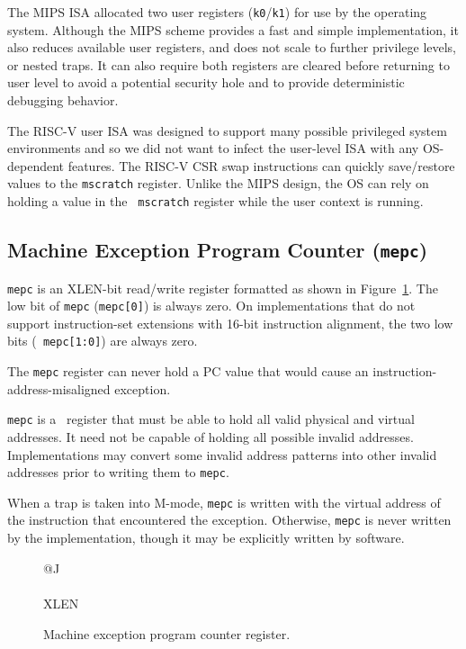 \begin{commentary}
The MIPS ISA allocated two user registers ({\tt k0}/{\tt k1}) for use
by the operating system.  Although the MIPS scheme provides a fast and
simple implementation, it also reduces available user registers,  and
does not scale to further privilege levels, or nested traps.  It can
also require both registers are cleared before returning to user level
to avoid a potential security hole and to provide deterministic
debugging behavior.

The RISC-V user ISA was designed to support many possible privileged
system environments and so we did not want to infect the user-level
ISA with any OS-dependent features.  The RISC-V CSR swap instructions
can quickly save/restore values to the {\tt mscratch} register.
Unlike the MIPS design, the OS can rely on holding a value in the {\tt
  mscratch} register while the user context is running.
\end{commentary}

\subsection{Machine Exception Program Counter ({\tt mepc})}

{\tt mepc} is an XLEN-bit read/write register formatted as shown in
Figure~\ref{mepcreg}.  The low bit of {\tt mepc} ({\tt mepc[0]}) is
always zero.  On implementations that do not support instruction-set
extensions with 16-bit instruction alignment, the two low bits ({\tt
  mepc[1:0]}) are always zero.

\begin{commentary}
The {\tt mepc} register can never hold a PC value that would cause an
instruction-address-misaligned exception.
\end{commentary}

{\tt mepc} is a \warl\ register that must be able to hold all valid physical
and virtual addresses.  It need not be capable of holding all possible invalid
addresses.  Implementations may convert some invalid address patterns into
other invalid addresses prior to writing them to {\tt mepc}.

When a trap is taken into M-mode, {\tt mepc} is written with the virtual
address of the instruction that encountered the exception.  Otherwise,
{\tt mepc} is never written by the implementation, though it may be
explicitly written by software.

\begin{figure}[h!]
{\footnotesize
\begin{center}
\begin{tabular}{@{}J}
 \\
\hline
{} \\
\hline
XLEN \\
\end{tabular}
\end{center}
}
\vspace{-0.1in}
\caption{Machine exception program counter register.}
\label{mepcreg}
\end{figure}

